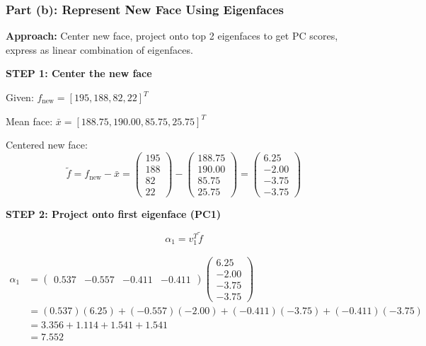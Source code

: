 \documentclass[12pt]{article}
\begin{document}
\subsubsection{Part (b): Represent New Face Using Eigenfaces}

\begin{solution}

\textbf{Approach:} Center new face, project onto top 2 eigenfaces to get PC scores, express as linear combination of eigenfaces.

\textbf{STEP 1: Center the new face}

Given: $f_{\text{new}} = [195, 188, 82, 22]^T$

Mean face: $\bar{x} = [188.75, 190.00, 85.75, 25.75]^T$

Centered new face:
\[
\tilde{f} = f_{\text{new}} - \bar{x} = \begin{pmatrix}
195 \\
188 \\
82 \\
22
\end{pmatrix} - \begin{pmatrix}
188.75 \\
190.00 \\
85.75 \\
25.75
\end{pmatrix} = \begin{pmatrix}
6.25 \\
-2.00 \\
-3.75 \\
-3.75
\end{pmatrix}
\]

\textbf{STEP 2: Project onto first eigenface (PC1)}

\[
\alpha_1 = v_1^T \tilde{f}
\]

\begin{align*}
\alpha_1 &= \begin{pmatrix}
0.537 & -0.557 & -0.411 & -0.411
\end{pmatrix}
\begin{pmatrix}
6.25 \\
-2.00 \\
-3.75 \\
-3.75
\end{pmatrix} \\
&= (0.537)(6.25) + (-0.557)(-2.00) + (-0.411)(-3.75) + (-0.411)(-3.75) \\
&= 3.356 + 1.114 + 1.541 + 1.541 \\
&= 7.552
\end{align*}


\end{solution}
\end{document}
